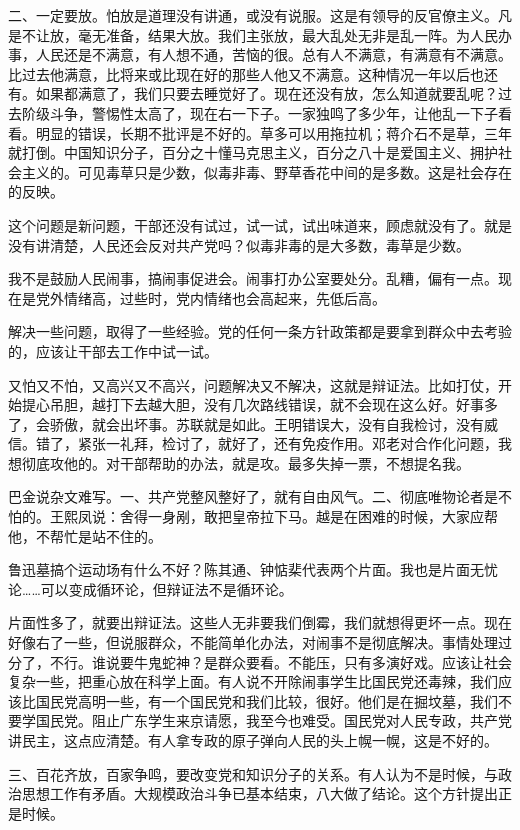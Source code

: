 二、一定要放。怕放是道理没有讲通，或没有说服。这是有领导的反官僚主义。凡是不让放，毫无准备，结果大放。我们主张放，最大乱处无非是乱一阵。为人民办事，人民还是不满意，有人想不通，苦恼的很。总有人不满意，有满意有不满意。比过去他满意，比将来或比现在好的那些人他又不满意。这种情况一年以后也还有。如果都满意了，我们只要去睡觉好了。现在还没有放，怎么知道就要乱呢？过去阶级斗争，警惕性太高了，现在右一下子。一家独鸣了多少年，让他乱一下子看看。明显的错误，长期不批评是不好的。草多可以用拖拉机；蒋介石不是草，三年就打倒。中国知识分子，百分之十懂马克思主义，百分之八十是爱国主义、拥护社会主义的。可见毒草只是少数，似毒非毒、野草香花中间的是多数。这是社会存在的反映。

这个问题是新问题，干部还没有试过，试一试，试出味道来，顾虑就没有了。就是没有讲清楚，人民还会反对共产党吗？似毒非毒的是大多数，毒草是少数。

我不是鼓励人民闹事，搞闹事促进会。闹事打办公室要处分。乱糟，偏有一点。现在是党外情绪高，过些时，党内情绪也会高起来，先低后高。

解决一些问题，取得了一些经验。党的任何一条方针政策都是要拿到群众中去考验的，应该让干部去工作中试一试。

又怕又不怕，又高兴又不高兴，问题解决又不解决，这就是辩证法。比如打仗，开始提心吊胆，越打下去越大胆，没有几次路线错误，就不会现在这么好。好事多了，会骄傲，就会出坏事。苏联就是如此。王明错误大，没有自我检讨，没有威信。错了，紧张一礼拜，检讨了，就好了，还有免疫作用。邓老对合作化问题，我想彻底攻他的。对干部帮助的办法，就是攻。最多失掉一票，不想提名我。

巴金说杂文难写。一、共产党整风整好了，就有自由风气。二、彻底唯物论者是不怕的。王熙凤说：舍得一身剐，敢把皇帝拉下马。越是在困难的时候，大家应帮他，不帮忙是站不住的。

鲁迅墓搞个运动场有什么不好？陈其通、钟惦棐代表两个片面。我也是片面无忧论……可以变成循环论，但辩证法不是循环论。

片面性多了，就要出辩证法。这些人无非要我们倒霉，我们就想得更坏一点。现在好像右了一些，但说服群众，不能简单化办法，对闹事不是彻底解决。事情处理过分了，不行。谁说要牛鬼蛇神？是群众要看。不能压，只有多演好戏。应该让社会复杂一些，把重心放在科学上面。有人说不开除闹事学生比国民党还毒辣，我们应该比国民党高明一些，有一个国民党和我们比较，很好。他们是在掘坟墓，我们不要学国民党。阻止广东学生来京请愿，我至今也难受。国民党对人民专政，共产党讲民主，这点应清楚。有人拿专政的原子弹向人民的头上幌一幌，这是不好的。

三、百花齐放，百家争鸣，要改变党和知识分子的关系。有人认为不是时候，与政治思想工作有矛盾。大规模政治斗争已基本结束，八大做了结论。这个方针提出正是时候。

